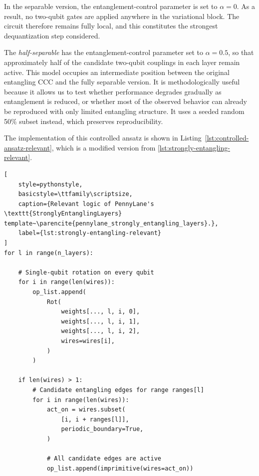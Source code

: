 \documentclass[12pt,a4paper,openany]{report}
\let\parencite\citep
\begin{document}
In the separable version, the entanglement-control parameter is set to $\alpha = 0$. As a result, no two-qubit gates are applied anywhere in the variational block. The circuit therefore remains fully local, and this constitutes the strongest dequantization step considered.

The \emph{half-separable} has the entanglement-control parameter set to $\alpha = 0.5$, so that approximately half of the candidate two-qubit couplings in each layer remain active. This model occupies an intermediate position between the original entangling CCC and the fully separable version. It is methodologically useful because it allows us to test whether performance degrades gradually as entanglement is reduced, or whether most of the observed behavior can already be reproduced with only limited entangling structure. It uses a seeded random 50\% subset instead, which preserves reproducibility.

The implementation of this controlled ansatz is shown in
Listing~\ref{lst:controlled-ansatz-relevant}, which is a modified version from \ref{lst:strongly-entangling-relevant}.
\begin{lstlisting}[
    style=pythonstyle,
    basicstyle=\ttfamily\scriptsize,
    caption={Relevant logic of PennyLane's \texttt{StronglyEntanglingLayers} template~\parencite{pennylane_strongly_entangling_layers}.},
    label={lst:strongly-entangling-relevant}
]
for l in range(n_layers):

    # Single-qubit rotation on every qubit
    for i in range(len(wires)):
        op_list.append(
            Rot(
                weights[..., l, i, 0],
                weights[..., l, i, 1],
                weights[..., l, i, 2],
                wires=wires[i],
            )
        )

    if len(wires) > 1:
        # Candidate entangling edges for range ranges[l]
        for i in range(len(wires)):
            act_on = wires.subset(
                [i, i + ranges[l]],
                periodic_boundary=True,
            )

            # All candidate edges are active
            op_list.append(imprimitive(wires=act_on))
\end{lstlisting}
\end{document}
